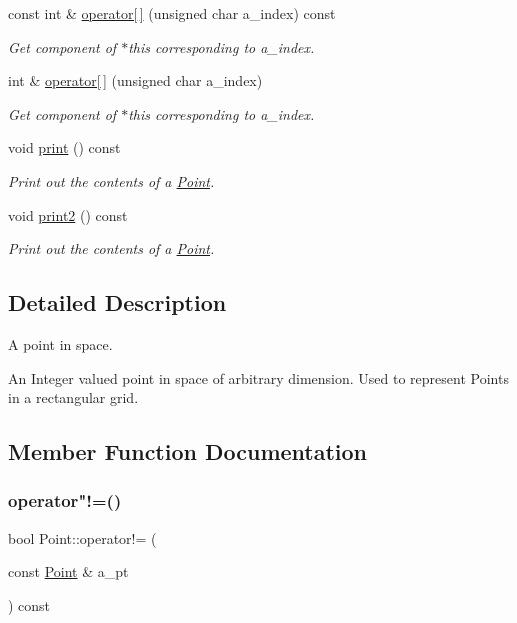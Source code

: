 \begin{DoxyCompactItemize}
const int \& \hyperlink{class_point_a267f1f8120637239e6486bdae0ad48e0}{operator\mbox{[}$\,$\mbox{]}} (unsigned char a\+\_\+index) const
\begin{DoxyCompactList}\small\item\em Get component of $\ast$this corresponding to a\+\_\+index. \end{DoxyCompactList}\item 
\mbox{\label{class_point_aa92158a649554fe87ccf3c2cf4065737}} 
int \& \hyperlink{class_point_aa92158a649554fe87ccf3c2cf4065737}{operator\mbox{[}$\,$\mbox{]}} (unsigned char a\+\_\+index)
\begin{DoxyCompactList}\small\item\em Get component of $\ast$this corresponding to a\+\_\+index. \end{DoxyCompactList}\item 
void \hyperlink{class_point_ae1b141ad286025fc7b4183cc27ef8c0d}{print} () const
\begin{DoxyCompactList}\small\item\em Print out the contents of a \hyperlink{class_point}{Point}. \end{DoxyCompactList}\item 
void \hyperlink{class_point_a8d35b17f0c98a44464926cf605e3d7b6}{print2} () const
\begin{DoxyCompactList}\small\item\em Print out the contents of a \hyperlink{class_point}{Point}. \end{DoxyCompactList}\end{DoxyCompactItemize}


\subsection{Detailed Description}
A point in space. 

An Integer valued point in space of arbitrary dimension. Used to represent Points in a rectangular grid. 

\subsection{Member Function Documentation}
\mbox{\label{class_point_abc6eed13223637f36a7d00adadb20931}} 
\subsubsection{\texorpdfstring{operator"!=()}{operator!=()}}
{\footnotesize\ttfamily bool Point\+::operator!= (\begin{DoxyParamCaption}\item[{const \hyperlink{class_point}{Point} \&}]{a\+\_\+pt }\end{DoxyParamCaption}) const\hspace{0.3cm}{\ttfamily [inline]}}



